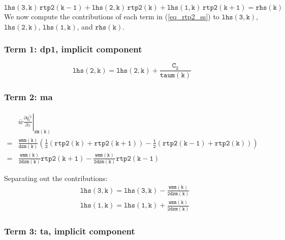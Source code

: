 \documentclass[11pt,fleqn]{article}
\newcommand{\ptlder}[2]{\frac{\partial #1}{\partial #2}}
\begin{document}
%
\begin{equation}
\mathtt{ lhs(3,k) \, rtp2(k-1) + lhs(2,k) \, rtp2(k) + lhs(1,k) \, rtp2(k+1) = rhs(k) }
\end{equation}
%
We now compute the contributions of each term in (\ref{eq_rtp2_ss}) to
$\mathtt{lhs(3,k)}$, $\mathtt{lhs(2,k)}$, $\mathtt{lhs(1,k)}$, 
and $\mathtt{rhs(k)}$.

\subsubsection{Term 1:  dp1, implicit component}

\begin{equation}
\mathtt{ lhs(2,k) = lhs(2,k) + \frac{C_2}{taum(k)} }
\end{equation}

\subsubsection{Term 2:  ma}

\begin{equation}
\begin{split}
& \left. \bar{w}\ptlder{\overline{q^{'2}_t}}{z} \right|_{\mathtt{zm(k)}} \\
=& \mathtt{ \frac{wmm(k)}{dzm(k)}
   \left(
     \frac{1}{2} \left( rtp2(k)+rtp2(k+1) \right)
     - \frac{1}{2} \left( rtp2(k-1)+rtp2(k) \right)
   \right) } \\
=& \mathtt{ \frac{wmm(k)}{2 dzm(k)} rtp2(k+1) - \frac{wmm(k)}{2 dzm(k)} rtp2(k-1) }
\end{split}
\end{equation}

Separating out the contributions:
%
\begin{equation}
\begin{split}
& \mathtt{ lhs(3,k) = lhs(3,k) - \frac{wmm(k)}{2 dzm(k)} } \\
& \mathtt{ lhs(1,k) = lhs(1,k) + \frac{wmm(k)}{2 dzm(k)} }
\end{split}
\end{equation}

\subsubsection{Term 3:  ta, implicit component}
\end{document}
